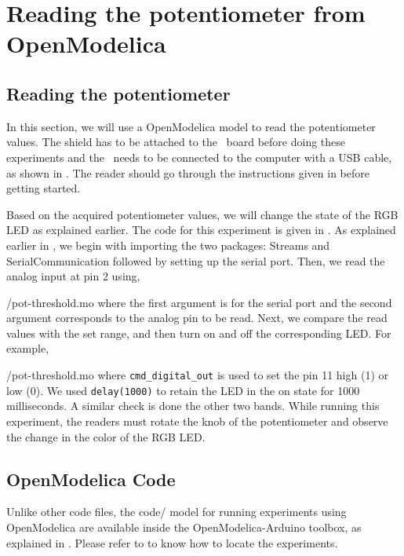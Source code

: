 \section{Reading the potentiometer from OpenModelica}
\subsection{Reading the potentiometer}
In this section, we will use a OpenModelica model to read the potentiometer values.  
The shield has to be attached to the \arduino\ board
before doing these experiments and the \arduino\ needs to be connected to the computer 
with a USB cable, as shown in .
The reader should go through the instructions given in
 before getting started.

Based on the acquired potentiometer values, we will change the state of the 
RGB LED as explained earlier. The code for this experiment is given in
. As explained earlier in , 
  we begin with importing the two packages: Streams and SerialCommunication followed 
  by setting up the serial port. Then, we read the analog input at pin 2 using,

{\LocPotOpenModelicacode/pot-threshold.mo} where the first argument is for
the serial port and the second argument corresponds to the analog pin to be read.  Next, we compare the read values with the set range, and then turn on and off the corresponding LED. For example, 

{\LocPotOpenModelicacode/pot-threshold.mo} 
where {\tt cmd\_digital\_out} is used to set the pin 11 high (1) or low (0). 
We used {\tt delay(1000)} to retain the LED in the on state for 1000 milliseconds.  
A similar check is done the other two bands. 
While running this experiment, 
the readers must rotate the knob of the potentiometer and observe 
the change in the color of the RGB LED.
\subsection{OpenModelica Code}
Unlike other code files, the code/ model for running experiments using OpenModelica are 
available inside the OpenModelica-Arduino toolbox, as explained in .
Please refer to  to know how to locate the experiments. 

\label{sec:pot-OpenModelica-code}
\begin{OpenModelicacode}
\label{OpenModelica:pot-100}

\end{OpenModelicacode}
